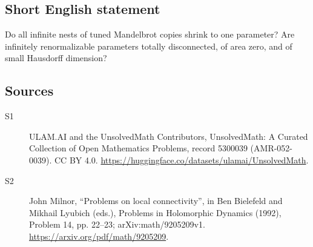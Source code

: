 \documentclass[11pt]{article}
\begin{document}
\subsection{Short English statement}
Do all infinite nests of tuned Mandelbrot copies shrink to one parameter? Are infinitely renormalizable parameters totally disconnected, of area zero, and of small Hausdorff dimension?
\subsection{Sources}
\begin{description}
\item[\hypertarget{source:5300039:1}{S1}] ULAM.AI and the UnsolvedMath Contributors, UnsolvedMath: A Curated Collection of Open Mathematics Problems, record 5300039 (AMR-052-0039). CC BY 4.0. \url{https://huggingface.co/datasets/ulamai/UnsolvedMath}.
\item[\hypertarget{source:5300039:2}{S2}] John Milnor, ``Problems on local connectivity'', in Ben Bielefeld and Mikhail Lyubich (eds.), Problems in Holomorphic Dynamics (1992), Problem 14, pp. 22--23; arXiv:math/9205209v1. \url{https://arxiv.org/pdf/math/9205209}.
\end{description}
\label{end:5300039}
\end{document}
